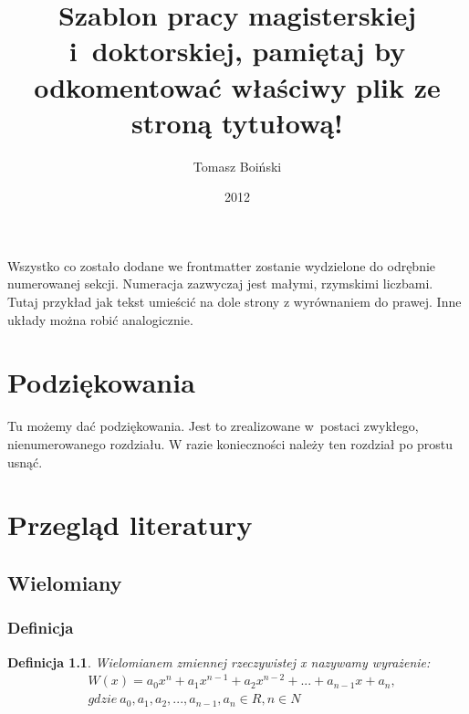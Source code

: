 \documentclass[twoside,a4paper]{book}
\title{Szablon pracy magisterskiej i~doktorskiej, pamiętaj by odkomentować właściwy plik ze stroną tytułową!}
\author{Tomasz Boiński}
\date{2012}
\newtheorem{definition}{Definicja}
\begin{document}
\frontmatter
\maketitle
\tableofcontents

\newpage
\null
\vfill
\begin{flushright}
  Wszystko co zostało dodane we frontmatter zostanie wydzielone do odrębnie numerowanej sekcji. Numeracja zazwyczaj jest małymi, rzymskimi liczbami. Tutaj przykład jak tekst umieścić na dole strony z wyrównaniem do prawej. Inne układy można robić analogicznie.
\end{flushright}

\chapter*{Podziękowania}
Tu możemy dać podziękowania. Jest to zrealizowane w~postaci zwykłego, nienumerowanego rozdziału. W razie konieczności należy ten rozdział po prostu usnąć.















\mainmatter

\chapter{Przegląd literatury}
\section{Wielomiany}
\subsection{Definicja}




\begin{definition}
	Wielomianem zmiennej rzeczywistej x nazywamy wyrażenie:
	\begin{equation}
		\begin{split}
			&W(x) = a_0x^n + a_1x^{n-1} + a_2x^{n-2}+ ... + a_{n-1}x + a_n, \\
			&gdzie\ a_0, a_1, a_2, ..., a_{n-1}, a_n\in R, n \in N 
		\end{split}
	\end{equation}
\end{definition}
\end{document}
